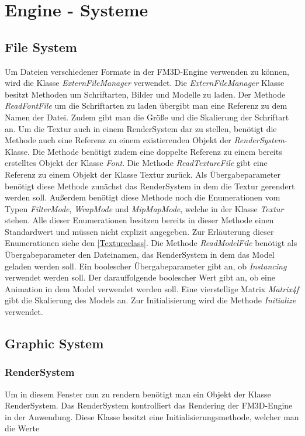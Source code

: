 \section{Engine - Systeme}


\subsection{File System}
Um Dateien verschiedener Formate in der FM3D-Engine verwenden zu können, wird die Klasse \textit{ExternFileManager} verwendet.
Die \textit{ExternFileManager} Klasse besitzt Methoden um Schriftarten, Bilder und Modelle zu laden. Der Methode \textit{ReadFontFile} um die Schriftarten zu laden übergibt man eine Referenz zu dem Namen der Datei. Zudem gibt man die Größe und die Skalierung der Schriftart an. Um die Textur auch in einem RenderSystem dar zu stellen, benötigt die Methode auch eine Referenz zu einem existierenden Objekt der \textit{RenderSystem}-Klasse. Die Methode benötigt zudem eine doppelte Referenz zu einem bereits erstelltes Objekt der Klasse \textit{Font}. 
Die Methode \textit{ReadTextureFile} gibt eine Referenz zu einem Objekt der Klasse Textur zurück. Als Übergabeparameter benötigt diese Methode zunächst das RenderSystem in dem die Textur gerendert werden soll. Außerdem benötigt diese Methode noch  die Enumerationen vom Typen \textit{FilterMode}, \textit{WrapMode} und \textit{MipMapMode}, welche in der Klasse \textit{Textur} stehen. Alle dieser Enumerationen besitzen bereits in dieser Methode einen Standardwert und müssen nicht explizit angegeben. Zur Erläuterung dieser Enumerationen siehe den \cref{Textureclass}. 
Die Methode \textit{ReadModelFile} benötigt als Übergabeparameter den Dateinamen, das RenderSystem in dem das Model geladen werden soll. Ein boolescher Übergabeparameter gibt an, ob \textit{Instancing} verwendet werden soll. Der darauffolgende  boolescher Wert gibt an, ob eine Animation in dem Model verwendet werden soll. Eine vierstellige Matrix \textit{Matrix4f} gibt die Skalierung des Models an.
Zur Initialisierung wird die Methode \textit{Initialize} verwendet.

\subsection{Graphic System}

\subsubsection{RenderSystem}
Um in diesem Fenster nun zu rendern benötigt man ein Objekt der Klasse RenderSystem. Das RenderSystem kontrolliert das Rendering der FM3D-Engine in der Anwendung. Diese Klasse besitzt eine Initialisierungsmethode, welcher man die Werte 


